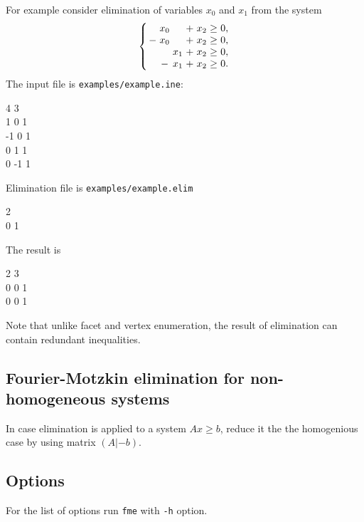 \documentclass{article}
\newenvironment{narrowarray}[1]{\arraycolsep=0.15em\begin{array}{#1}}{\end{array}}
\begin{document}
For example consider elimination of variables $x_0$ and $x_1$ from the system
$$
\left\{
\begin{narrowarray}{ccccccl}
 &x_0 &       & + & x_2  & \ge & 0, \\
-&x_0 &       & + & x_2 & \ge & 0, \\
 &      & x_1 & + & x_2 & \ge & 0, \\
 &     -& x_1 & + & x_2 & \ge & 0. \\
\end{narrowarray}
\right.
$$
The input file is \verb$examples/example.ine$:
\begin{adjustwidth}{5cm}{0pt}
4 3 \\
1 0 1 \\
-1 0 1 \\
0 1 1 \\
0 -1 1
\end{adjustwidth}
Elimination file is \verb$examples/example.elim$
\begin{adjustwidth}{5cm}{0pt}
2 \\
0 1
\end{adjustwidth}
The result is
\begin{adjustwidth}{5cm}{0pt}
2 3 \\
0 0 1 \\
0 0 1
\end{adjustwidth}

Note that unlike facet and vertex enumeration, the result of elimination can contain redundant inequalities.

\subsection{Fourier-Motzkin elimination for non-homogeneous systems}

In case elimination is applied to a system $Ax \geq b$, reduce it the the homogenious case by using matrix $(A|-b)$.

\subsection{Options}\label{sec_FMEOptions}

For the list of options run \verb$fme$ with \verb$-h$ option.


%

%
\end{document}
